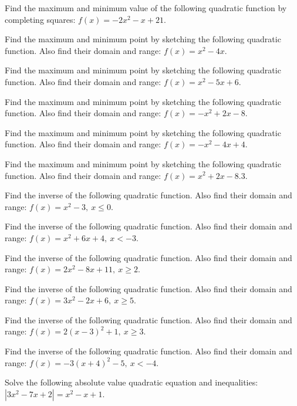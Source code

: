 \documentclass[11pt,a4paper]{article}
\begin{document}
\begin{longlist}
\item Find the maximum and minimum value of the following quadratic function by completing squares: $f(x)=-2x^2-x+21$.

\item Find the maximum and minimum point by sketching the following quadratic function. Also find their domain and range: $f(x)=x^2-4x$.

\item Find the maximum and minimum point by sketching the following quadratic function. Also find their domain and range: $f(x)=x^2-5x+6$.

\item Find the maximum and minimum point by sketching the following quadratic function. Also find their domain and range: $f(x)=-x^2+2x-8$.

\item Find the maximum and minimum point by sketching the following quadratic function. Also find their domain and range: $f(x)=-x^2-4x+4$.

\item Find the maximum and minimum point by sketching the following quadratic function. Also find their domain and range: $f(x)=x^2+2x-8.3$.

\item Find the inverse of the following quadratic function. Also find their domain and range: $f(x)=x^2-3,\ x\leq 0$.

\item Find the inverse of the following quadratic function. Also find their domain and range: $f(x)=x^2+6x+4,\ x<-3$.

\item Find the inverse of the following quadratic function. Also find their domain and range: $f(x)=2x^2-8x+11,\ x\geq 2$.

\item Find the inverse of the following quadratic function. Also find their domain and range: $f(x)=3x^2-2x+6,\ x\geq 5$.

\item Find the inverse of the following quadratic function. Also find their domain and range: $f(x)=2(x-3)^2+1,\ x\geq 3$.

\item Find the inverse of the following quadratic function. Also find their domain and range: $f(x)=-3(x+4)^2-5,\ x<-4$.

\item Solve the following absolute value quadratic equation and inequalities: $|3x^2-7x+2|=x^2-x+1$.


\end{longlist}
\end{document}
